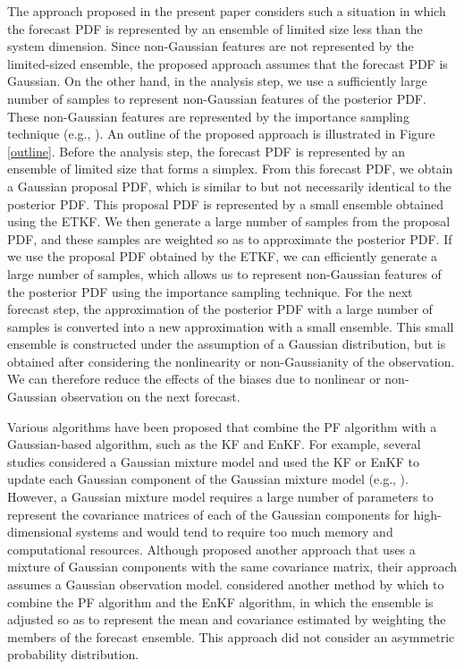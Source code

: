 \documentclass[useAMS,usenatbib]{tellus}
\begin{document}
The approach proposed in the present paper considers such a situation
in which the forecast PDF is represented by an ensemble of limited size
less than the system dimension.
Since non-Gaussian features are not represented by the
limited-sized ensemble, the proposed approach
assumes that the forecast PDF is Gaussian.
On the other hand, in the analysis step,
we use a sufficiently large number of samples
to represent non-Gaussian features of the posterior PDF.
These non-Gaussian features are represented by the importance sampling
technique (e.g., \citealp{liu2001,can2009}).
An outline of the proposed approach is illustrated in Figure \ref{outline}.
Before the analysis step, the forecast PDF is represented
by an ensemble of limited size that forms a simplex.
From this forecast PDF, we obtain a Gaussian proposal PDF,
which is similar to but not necessarily identical to the posterior PDF.
This proposal PDF is represented by a small ensemble obtained
using the ETKF. We then generate a large number of samples from
the proposal PDF, and these samples are weighted so as to approximate
the posterior PDF. If we use the proposal PDF obtained by the ETKF,
we can efficiently generate a large number of samples,
which allows us to represent non-Gaussian features of the posterior PDF
using the importance sampling technique.
For the next forecast step, the approximation of the posterior PDF
with a large number of samples is converted into a new approximation
with a small ensemble. This small ensemble is constructed
under the assumption of a Gaussian distribution, but is obtained
after considering the nonlinearity
or non-Gaussianity of the observation. We can therefore reduce
the effects of the biases due to nonlinear or non-Gaussian observation
on the next forecast.

Various algorithms have been proposed that combine
the PF algorithm with a Gaussian-based algorithm, such as the KF
and EnKF.
For example, several studies considered a Gaussian mixture model
and used the KF or EnKF to update each Gaussian component
of the Gaussian mixture model (e.g., \citealp{smi2007,hot+al2012}).
However, a Gaussian mixture model requires a large number of parameters
to represent the covariance matrices of each of the Gaussian components
for high-dimensional systems and would tend to require too much
memory and computational resources.
Although \cite{hot+al2008} proposed another approach that uses a mixture
of Gaussian components with the same covariance matrix,
their approach assumes a Gaussian observation model.
\cite{leibic2011} considered another method by which to combine
the PF algorithm and the EnKF algorithm, in which
the ensemble is adjusted so as to represent the mean and covariance
estimated by weighting the members of the forecast ensemble.
This approach did not consider an asymmetric probability distribution.
\end{document}
